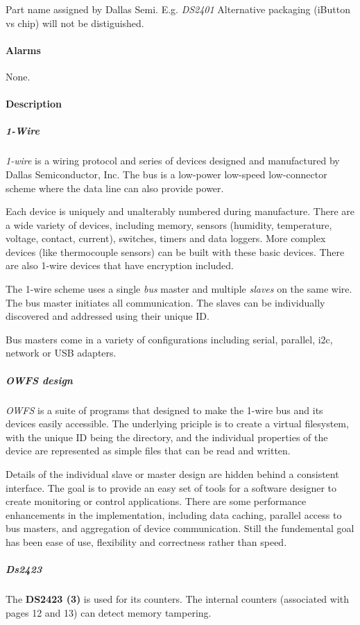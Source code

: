 Part name assigned by Dallas Semi. E.g. \textit{DS2401} Alternative packaging (iButton
vs chip) will not be distiguished.  
\paragraph*{Alarms}
None. 
\paragraph*{Description}
          
\subparagraph*{1-Wire}\textit{1-wire}
 is a wiring protocol and series of devices designed and manufactured by
Dallas Semiconductor, Inc. The bus is a low-power low-speed low-connector scheme
where the data line can also provide power. 

Each device is uniquely and
unalterably numbered during manufacture. There are a wide variety of devices,
including memory, sensors (humidity, temperature, voltage, contact, current),
switches, timers and data loggers. More complex devices (like thermocouple
sensors) can be built with these basic devices. There are also 1-wire devices
that have encryption included. 

The 1-wire scheme uses a single  \textit{bus} master
and multiple \textit{slaves} on the same wire. The bus master initiates all communication.
The slaves can be  individually discovered and addressed using their unique
ID. 

Bus masters come in a variety of configurations including serial, parallel,
i2c, network or USB adapters. 
\subparagraph*{OWFS design}\textit{OWFS} is a suite of programs that
designed to make the 1-wire bus and its devices easily accessible. The underlying
priciple is to create a virtual filesystem, with the unique ID being the
directory, and the individual properties of the device are represented
as simple files that can be read and written. 

Details of the individual
slave or master design are hidden behind a consistent interface. The goal
is to  provide an easy set of tools for a software designer to create monitoring
or control applications. There  are some performance enhancements in the
implementation, including data caching, parallel access to bus  masters,
and aggregation of device communication. Still the fundemental goal has
been ease of use, flexibility  and correctness rather than speed.  
\subparagraph*{Ds2423}The
\textsf{\textbf{DS2423 (3)}} is used for its counters. The internal counters (associated with
pages 12 and 13) can detect memory tampering. 

